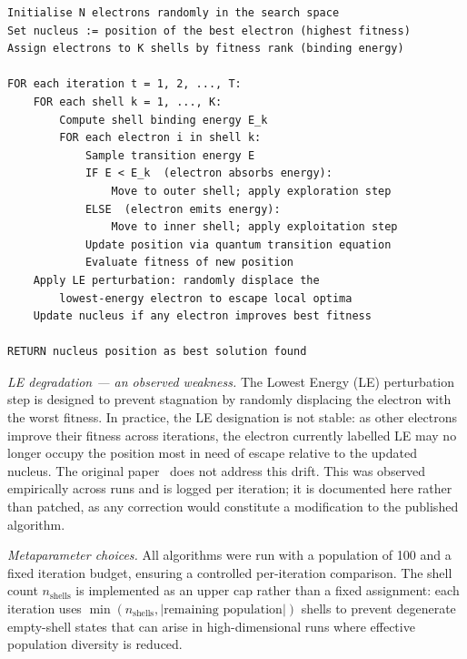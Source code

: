 \begin{lstlisting}[basicstyle=\small\ttfamily, breaklines=true, columns=fullflexible, keepspaces=true, frame=single, xleftmargin=1.5em, xrightmargin=1em]
Initialise N electrons randomly in the search space
Set nucleus := position of the best electron (highest fitness)
Assign electrons to K shells by fitness rank (binding energy)

FOR each iteration t = 1, 2, ..., T:
    FOR each shell k = 1, ..., K:
        Compute shell binding energy E_k
        FOR each electron i in shell k:
            Sample transition energy E
            IF E < E_k  (electron absorbs energy):
                Move to outer shell; apply exploration step
            ELSE  (electron emits energy):
                Move to inner shell; apply exploitation step
            Update position via quantum transition equation
            Evaluate fitness of new position
    Apply LE perturbation: randomly displace the
        lowest-energy electron to escape local optima
    Update nucleus if any electron improves best fitness

RETURN nucleus position as best solution found
\end{lstlisting}

\textit{LE degradation --- an observed weakness.} The Lowest Energy (LE)
perturbation step is designed to prevent stagnation by randomly displacing
the electron with the worst fitness. In practice, the LE designation is not
stable: as other electrons improve their fitness across iterations, the
electron currently labelled LE may no longer occupy the position most in need
of escape relative to the updated nucleus. The original
paper~\cite{azizi2021} does not address this drift. This was observed
empirically across runs and is logged per iteration; it is documented here
rather than patched, as any correction would constitute a modification to the
published algorithm.

\textit{Metaparameter choices.} All algorithms were run with a population of 
100 and a fixed iteration budget, ensuring a controlled per-iteration comparison.
The shell count $n_\text{shells}$ is implemented as an upper cap rather than a fixed
assignment: each iteration uses $\min(n_\text{shells}, |\text{remaining
population}|)$ shells to prevent degenerate empty-shell states that can arise
in high-dimensional runs where effective population diversity is reduced.
